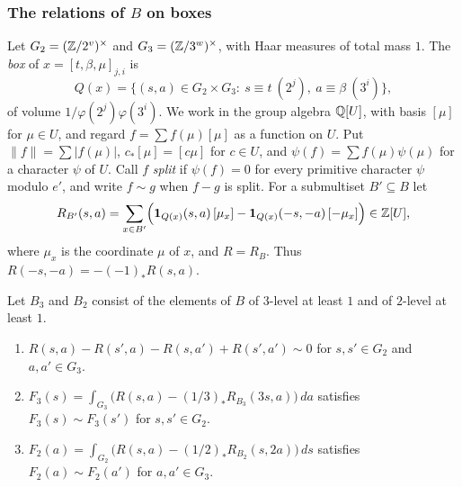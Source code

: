\subsubsection*{The relations of \texorpdfstring{$B$}{B} on boxes}
Let $G_{2}=(\mathbb{Z}/2^{v})^{\times}$ and $G_{3}=(\mathbb{Z}/3^{w})^{\times}$, with Haar
measures of total mass $1$. The \emph{box} of $x=[t,\beta,\mu]_{j,i}$ is
\[
  Q(x)=\{(s,a)\in G_{2}\times G_{3}:\ s\equiv t\ (2^{j}),\
  a\equiv\beta\ (3^{i})\},
\]
of volume $1/\varphi(2^{j})\varphi(3^{i})$. We work in the group algebra
$\mathbb{Q}[U]$, with basis $[\mu]$ for $\mu\in U$, and regard $f=\sum f(\mu)[\mu]$
as a function on $U$. Put $\|f\|=\sum|f(\mu)|$, $c_{*}[\mu]=[c\mu]$ for
$c\in U$, and $\psi(f)=\sum f(\mu)\psi(\mu)$ for a character $\psi$ of $U$.
Call $f$ \emph{split} if $\psi(f)=0$ for every primitive character $\psi$
modulo $e'$, and write $f\sim g$ when $f-g$ is split. For a submultiset
$B'\subseteq B$ let
\[
  R_{B'}(s,a)=\sum_{x\in B'}\Bigl(\mathbf 1_{Q(x)}(s,a)\,[\mu_{x}]
  -\mathbf 1_{Q(x)}(-s,-a)\,[-\mu_{x}]\Bigr)\in\mathbb{Z}[U],
\]
where $\mu_{x}$ is the coordinate $\mu$ of $x$, and $R=R_{B}$. Thus
$R(-s,-a)=-(-1)_{*}R(s,a)$.

\begin{lemma}\label{lem:boxrel}
Let $B_{3}$ and $B_{2}$ consist of the elements of $B$ of $3$-level at least
$1$ and of $2$-level at least $1$.
\begin{enumerate}[label=\textup{(\alph*)}]
\item $R(s,a)-R(s',a)-R(s,a')+R(s',a')\sim0$ for $s,s'\in G_{2}$ and
$a,a'\in G_{3}$.
\item $F_{3}(s)=\int_{G_{3}}\bigl(R(s,a)-(1/3)_{*}R_{B_{3}}(3s,a)\bigr)\,da$
satisfies $F_{3}(s)\sim F_{3}(s')$ for $s,s'\in G_{2}$.
\item $F_{2}(a)=\int_{G_{2}}\bigl(R(s,a)-(1/2)_{*}R_{B_{2}}(s,2a)\bigr)\,ds$
satisfies $F_{2}(a)\sim F_{2}(a')$ for $a,a'\in G_{3}$.
\end{enumerate}
\end{lemma}

